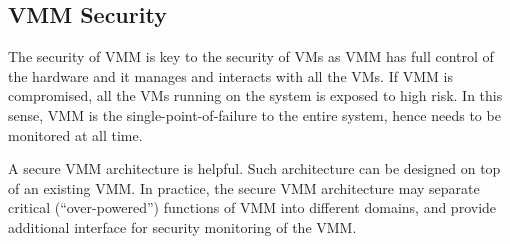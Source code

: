 \subsection{VMM Security}

The security of VMM is key to the security of VMs as VMM has full control of the hardware and it manages and interacts with all the VMs. If VMM is compromised, all the VMs running on the system is exposed to high risk. In this sense, VMM is the single-point-of-failure to the entire system, hence needs to be monitored at all time.

A secure VMM architecture is helpful. Such architecture can be designed on top of an existing VMM. In practice, the secure VMM architecture may separate critical (``over-powered'') functions of VMM into different domains, and provide additional interface for security monitoring of the VMM. 












